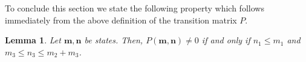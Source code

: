\documentclass[a4paper,preprint]{elsarticle}
\newtheorem{lemma}{Lemma}
\renewcommand{\vec}[1]{\boldsymbol{#1}}
\begin{document}
To conclude this section we state the following property which follows immediately from the above definition of the transition matrix $P$.
\begin{lemma}\label{lem:succ}
    Let $\vec{m},\vec{n}$ be states. Then, $P(\vec{m},\vec{n}) \neq 0$ if
    and only if $n_1 \leq m_1$ and $m_3 \leq n_3 \leq m_2 + m_3$.
\end{lemma}






\end{document}
